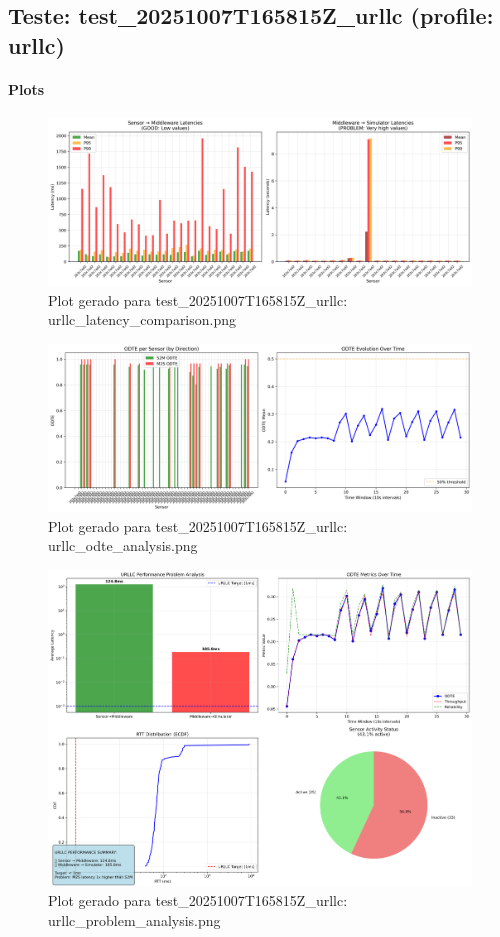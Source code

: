 \subsection{Teste: test_20251007T165815Z_urllc (profile: urllc)}
\paragraph{Plots}


\begin{figure}[ht]
	\centering
	\includegraphics[width=0.8\linewidth]{ article/plots/urllc/urllc_latency_comparison.png }
	\caption{Plot gerado para test_20251007T165815Z_urllc: urllc_latency_comparison.png }
\end{figure}

\begin{figure}[ht]
	\centering
	\includegraphics[width=0.8\linewidth]{ article/plots/urllc/urllc_odte_analysis.png }
	\caption{Plot gerado para test_20251007T165815Z_urllc: urllc_odte_analysis.png }
\end{figure}

\begin{figure}[ht]
	\centering
	\includegraphics[width=0.8\linewidth]{ article/plots/urllc/urllc_problem_analysis.png }
	\caption{Plot gerado para test_20251007T165815Z_urllc: urllc_problem_analysis.png }
\end{figure}



